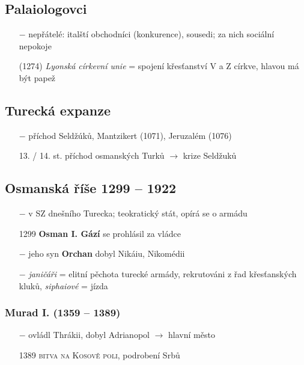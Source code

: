 \documentclass{article}
\begin{document}
\subsection*{Palaiologovci}
\begin{itemize}
    \vspace{-0.5em}
    \setlength\itemsep{0.15em}
    \item[$-$] nepřátelé: italští obchodníci (konkurence), sousedi; za nich sociální nepokoje
    \item[(1274)] \textit{Lyonská církevní unie} = spojení křesťanství V a Z církve, hlavou má být papež
\end{itemize}


\subsection*{Turecká expanze}
\begin{itemize}
    \vspace{-0.5em}
    \setlength\itemsep{0.15em}
    \item[$-$] příchod Seldžúků, Mantzikert (1071), Jeruzalém (1076)
    \item[13. / 14. st.] příchod osmanských Turků $\rightarrow$ krize Seldžuků
\end{itemize}


\subsection*{Osmanská říše 1299 -- 1922}
\begin{itemize}
    \vspace{-0.5em}
    \setlength\itemsep{0.15em}
    \item[$-$] v SZ dnešního Turecka; teokratický stát, opírá se o armádu
    \item[1299] \textbf{Osman I. Gází} se prohlásil za vládce
    \item[$-$] jeho syn \textbf{Orchan} dobyl Nikáiu, Nikomédii
    \item[$-$] \textit{janičáři} = elitní pěchota turecké armády, rekrutováni z řad křesťanských kluků, \textit{siphaiové} = jízda
\end{itemize}

\subsubsection*{Murad I. (1359 -- 1389)}
\begin{itemize}
    \vspace{-0.5em}
    \setlength\itemsep{0.15em}
    \item[$-$] ovládl Thrákii, dobyl Adrianopol $\rightarrow$ hlavní město
    \item[1389] \textsc{bitva na Kosově poli}, podrobení Srbů
\end{itemize}
\end{document}

